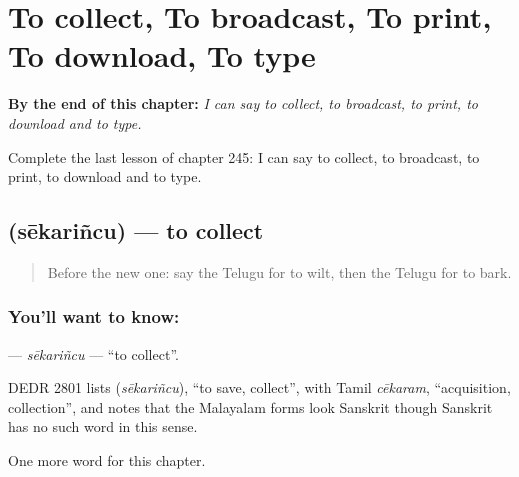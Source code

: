 
\chapter{To collect, To broadcast, To print, To download, To type}
\label{ch:te-to-collect-to-broadcast-to-print-to-download-to-type}

\begin{chapteropening}
\textbf{By the end of this chapter:} \emph{I can say to collect, to broadcast, to print, to download and to type.}

Complete the last lesson of chapter 245: I can say to collect, to broadcast, to print, to download and to type.
\end{chapteropening}

\section[\texorpdfstring{\te{సేకరించు} (sēkariñcu)}{సేకరించు (sēkariñcu)}]{ (sēkariñcu) — to collect}

\label{lesson:TE-C245-sekarincu}



\begin{quote}
Before the new one: say the Telugu for to wilt, then the Telugu for to bark.
\end{quote}

\subsection*{You'll want to know: }
\textbf{} — \emph{sēkariñcu} — \textquotedblleft{}to collect\textquotedblright{}.

\begin{cousinweb}
DEDR 2801 lists \textbf{} (\emph{sēkariñcu}), \textquotedblleft{}to save, collect\textquotedblright{}, with Tamil \emph{cēkaram}, \textquotedblleft{}acquisition, collection\textquotedblright{}, and notes that the Malayalam forms look Sanskrit though Sanskrit has no such word in this sense.
\end{cousinweb}

\begin{grammarlens}[title={What you've built}]
One more word for this chapter.
\end{grammarlens}

